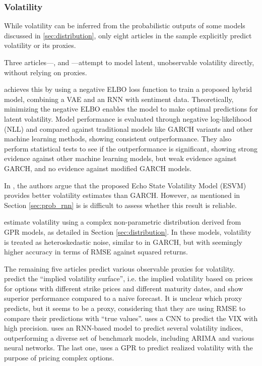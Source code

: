 \subsubsection{Volatility}

While volatility can be inferred from the probabilistic outputs of some models discussed in \ref{sec:distribution}, only eight articles in the sample explicitly predict volatility or its proxies.

Three articles—\textcite{Parker2021BayesianHeteroskedastic}, \textcite{xing2019sentiment} and \textcite{Platanios2014gpr}—attempt to model latent, unobservable volatility directly, without relying on proxies.

\textcite{xing2019sentiment} achieves this by using a negative ELBO loss function to train a proposed hybrid model, combining a VAE and an RNN with sentiment data. Theoretically, minimizing the negative ELBO enables the model to make optimal predictions for latent volatility. Model performance is evaluated through negative log-likelihood (NLL) and compared against traditional models like GARCH variants and other machine learning methods, showing consistent outperformance. They also perform statistical tests to see if the outperformance is significant, showing strong evidence against other machine learning models, but weak evidence against GARCH, and no evidence against modified GARCH models.

In \textcite{Parker2021BayesianHeteroskedastic}, the authors argue that the proposed Echo State Volatility Model (ESVM) provides better volatility estimates than GARCH. However, as mentioned in Section \ref{sec:prob_rnn} is is difficult to assess whether this result is reliable.

\textcite{Platanios2014gpr} estimate volatility using a complex non-parametric distribution derived from GPR models, as detailed in Section \ref{sec:distribution}. In these models, volatility is treated as heteroskedastic noise, similar to in GARCH, but with seemingly higher accuracy in terms of RMSE against squared returns.

The remaining five articles predict various observable proxies for volatility. \textcite{tegner2021probabilistic} predict the ``implied volatility surface'', i.e. the implied volatility based on prices for options with different strike prices and different maturity dates, and show superior performance compared to a naive forecast. It is unclear which proxy \textcite{jang2018empirical} predicts, but it seems to be a proxy, considering that they are using RMSE to compare their predictions with ``true values''. \textcite{Daniali2021} uses a CNN to predict the VIX with high precision. \textcite{Tian2023} uses an RNN-based model to predict several volatility indices, outperforming a diverse set of benchmark models, including ARIMA and various neural networks. The last one, \textcite{Hocht2024gpr} uses a GPR to predict realized volatility with the purpose of pricing complex options.

